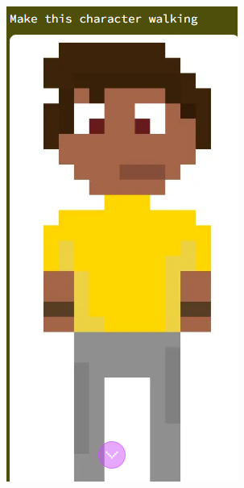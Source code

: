 \begin{figure}[htbp]
    \centering
    \caption{\small Resultado do teste inicial}
    \label{fig:rosebudJogo}
    \begin{subfigure}{0.3\linewidth}
        \centering
        \includegraphics[width=1\linewidth]{figs/rosebud/principal1.PNG}

\end{subfigure}
\end{figure}
